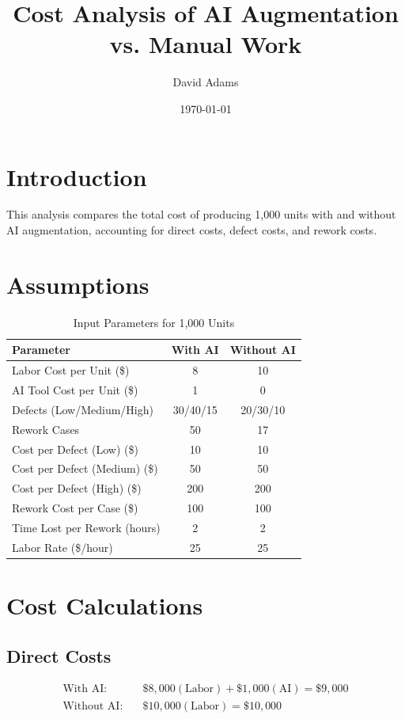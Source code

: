 \documentclass{article}
\title{Cost Analysis of AI Augmentation vs. Manual Work}
\author{David Adams}
\date{\today}
\begin{document}
\maketitle

\section{Introduction}
This analysis compares the total cost of producing 1,000 units with and without AI augmentation, accounting for direct costs, defect costs, and rework costs.

\section{Assumptions}
\begin{table}[h]
\centering
\caption{Input Parameters for 1,000 Units}
\label{table:params}
\begin{tabular}{lcc}
\toprule
Parameter                     & With AI & Without AI \\
\midrule
Labor Cost per Unit (\$)      & 8       & 10         \\
AI Tool Cost per Unit (\$)    & 1       & 0          \\
Defects (Low/Medium/High)     & 30/40/15 & 20/30/10   \\
Rework Cases                  & 50      & 17         \\
Cost per Defect (Low) (\$)    & 10      & 10         \\
Cost per Defect (Medium) (\$) & 50      & 50         \\
Cost per Defect (High) (\$)   & 200     & 200        \\
Rework Cost per Case (\$)     & 100     & 100        \\
Time Lost per Rework (hours)  & 2       & 2          \\
Labor Rate (\$/hour)          & 25      & 25         \\
\bottomrule
\end{tabular}
\end{table}

\section{Cost Calculations}
\subsection{Direct Costs}
\begin{align*}
\text{With AI:} & \quad \$8,000 (\text{Labor}) + \$1,000 (\text{AI}) = \boxed{\$9,000} \\
\text{Without AI:} & \quad \$10,000 (\text{Labor}) = \boxed{\$10,000}
\end{align*}
\end{document}
